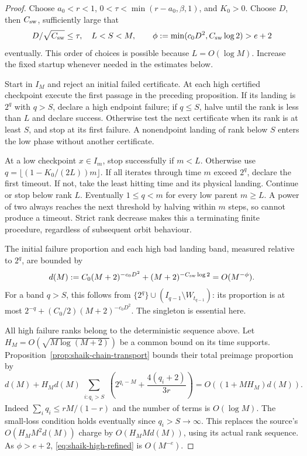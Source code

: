 \documentclass[11pt]{article}
\theoremstyle{remark}\newtheorem{remark}[proposition]{Remark}
\begin{document}
\begin{proof}
Choose \(a_0<r<1\), \(0<\tau<\min(r-a_0,\beta,1)\), and \(K_0>0\).
Choose \(D\), then \(C_{\rm sw}\), sufficiently large that
\[
 D/\sqrt{C_{\rm sw}}\le\tau,\quad L<S<M,\qquad
 \phi:=\min(c_0D^2,C_{\rm sw}\log2)>e+2
\]
eventually. This order of choices is possible because \(L=O(\log M)\).
Increase the fixed startup whenever needed in the estimates below.

Start in \(I_M\) and reject an initial failed certificate. At each high
certified checkpoint execute the first passage in the preceding
proposition. If its landing is \(2^q\) with \(q>S\), declare a high
endpoint failure; if \(q\le S\), halve until the rank is less than \(L\)
and declare success. Otherwise test the next certificate when its rank
is at least \(S\), and stop at its first failure. A nonendpoint landing
of rank below \(S\) enters the low phase without another certificate.

At a low checkpoint \(x\in I_m\), stop successfully if \(m<L\).
Otherwise use \(q=\lfloor(1-K_0/(2L))m\rfloor\). If all iterates through
time \(m\) exceed \(2^q\), declare the first timeout. If not, take the
least hitting time and its physical landing. Continue or stop below
rank \(L\). Eventually \(1\le q<m\) for every low parent \(m\ge L\).
A power of two always reaches the next threshold by halving within
\(m\) steps, so cannot produce a timeout. Strict rank decrease makes
this a terminating finite procedure, regardless of subsequent orbit
behaviour.

The initial failure proportion and each high bad landing band, measured
relative to \(2^q\), are bounded by
\[
 d(M):=C_0(M+2)^{-c_0D^2}+(M+2)^{-C_{\rm sw}\log2}
 =O(M^{-\phi}).
\]
For a band \(q>S\), this follows from
\(\{2^q\}\cup(I_{q-1}\setminus W_{t_{q-1}})\):
its proportion is at most
\(2^{-q}+(C_0/2)(M+2)^{-c_0D^2}\).
The singleton is essential here.

All high failure ranks belong to the deterministic sequence above.
Let \(H_M=O(\sqrt{M\log(M+2)})\) be a common bound on its time
supports. Proposition~\ref{prop:shaik-chain-transport} bounds their
total preimage proportion by
\begin{equation}\label{eq:shaik-high-refined}
 d(M)+H_Md(M)
 \sum_{\substack{i:q_i>S}}
 \left(2^{q_i-M}+\frac{4(q_i+2)}{3r}\right)
 =O((1+M H_M)d(M)).
\end{equation}
Indeed \(\sum_iq_i\le rM/(1-r)\) and the number of terms is \(O(\log M)\).
The small-loss condition holds eventually since \(q_i>S\to\infty\).
This replaces the source's \(O(H_M M^2d(M))\) charge by
\(O(H_M M d(M))\), using its actual rank sequence.
As \(\phi>e+2\), \eqref{eq:shaik-high-refined} is \(O(M^{-e})\).


\end{proof}
\end{document}
